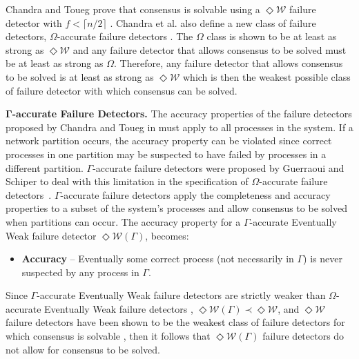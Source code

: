 Chandra and Toueg prove that consensus is solvable using a $\Diamond\mathcal{W}$ failure detector with $f < \lceil n/2 \rceil$ \cite{DeepakChandra1996}. Chandra et al. also define a new class of failure detectors, $\Omega$-accurate failure detectors \cite{Chandra1996}. The $\Omega$ class is shown to be at least as strong as $\Diamond\mathcal{W}$ and any failure detector that allows consensus to be solved must be at least as strong as $\Omega$. Therefore, any failure detector that allows consensus to be solved is at least as strong as $\Diamond\mathcal{W}$ which is then the weakest possible class of failure detector with which consensus can be solved. \par
\textbf{$\mathbf{\Gamma}$-accurate Failure Detectors.} The accuracy properties of the failure detectors proposed by Chandra and Toueg in \cite{DeepakChandra1996} must apply to all processes in the system. If a network partition occurs, the accuracy property can be violated since correct processes in one partition may be suspected to have failed by processes in a different  partition. $\Gamma$-accurate failure detectors were proposed by Guerraoui and Schiper to deal with this limitation in the specification of $\Omega$-accurate failure detectors~\cite{Guerraoui96gammaaccurate}. $\Gamma$-accurate failure detectors apply the completeness and accuracy properties to a subset of the system's processes and allow consensus to be solved when partitions can occur. The accuracy property for a $\Gamma$-accurate Eventually Weak failure detector $\Diamond\mathcal{W}(\Gamma)$, becomes: 
\begin{itemize}
\item\textbf{Accuracy} -- Eventually some correct process (not necessarily in $\Gamma$) is never suspected by any process in $\Gamma$.
\end{itemize}
Since $\Gamma$-accurate Eventually Weak failure detectors are strictly weaker than $\Omega$-accurate Eventually Weak failure detectors \cite{Guerraoui96gammaaccurate}, $\Diamond\mathcal{W}(\Gamma) \prec \Diamond\mathcal{W}$, and  $\Diamond\mathcal{W}$ failure detectors have been shown to be the weakest class of failure detectors for which consensus is solvable \cite{Chandra1996}, then it follows that $\Diamond\mathcal{W}(\Gamma)$ failure detectors do not allow for consensus to be solved.\par
